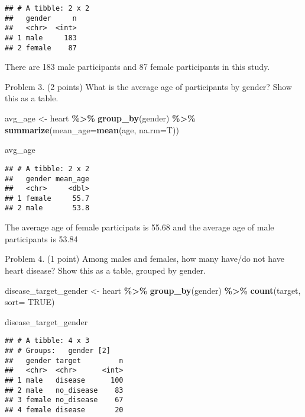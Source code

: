 \documentclass[
]{article}
\newenvironment{Shaded}{\begin{snugshade}}{\end{snugshade}}
\newcommand{\AttributeTok}[1]{\textcolor[rgb]{0.13,0.29,0.53}{#1}}
\newcommand{\ConstantTok}[1]{\textcolor[rgb]{0.56,0.35,0.01}{#1}}
\newcommand{\FunctionTok}[1]{\textcolor[rgb]{0.13,0.29,0.53}{\textbf{#1}}}
\newcommand{\NormalTok}[1]{#1}
\newcommand{\OtherTok}[1]{\textcolor[rgb]{0.56,0.35,0.01}{#1}}
\newcommand{\SpecialCharTok}[1]{\textcolor[rgb]{0.81,0.36,0.00}{\textbf{#1}}}
\begin{document}
\begin{verbatim}
## # A tibble: 2 x 2
##   gender     n
##   <chr>  <int>
## 1 male     183
## 2 female    87
\end{verbatim}

There are 183 male participants and 87 female participants in this
study.

Problem 3. (2 points) What is the average age of participants by gender?
Show this as a table.

\begin{Shaded}
\begin{Highlighting}[]
\NormalTok{avg\_age }\OtherTok{\textless{}{-}}\NormalTok{ heart }\SpecialCharTok{\%\textgreater{}\%}
  \FunctionTok{group\_by}\NormalTok{(gender) }\SpecialCharTok{\%\textgreater{}\%}
  \FunctionTok{summarize}\NormalTok{(}\AttributeTok{mean\_age=}\FunctionTok{mean}\NormalTok{(age, }\AttributeTok{na.rm=}\NormalTok{T))}

\NormalTok{avg\_age}
\end{Highlighting}
\end{Shaded}

\begin{verbatim}
## # A tibble: 2 x 2
##   gender mean_age
##   <chr>     <dbl>
## 1 female     55.7
## 2 male       53.8
\end{verbatim}

The average age of female participats is 55.68 and the average age of
male participants is 53.84

Problem 4. (1 point) Among males and females, how many have/do not have
heart disease? Show this as a table, grouped by gender.

\begin{Shaded}
\begin{Highlighting}[]
\NormalTok{disease\_target\_gender }\OtherTok{\textless{}{-}}\NormalTok{ heart }\SpecialCharTok{\%\textgreater{}\%}
  \FunctionTok{group\_by}\NormalTok{(gender) }\SpecialCharTok{\%\textgreater{}\%}
  \FunctionTok{count}\NormalTok{(target, }\AttributeTok{sort=} \ConstantTok{TRUE}\NormalTok{)}

\NormalTok{disease\_target\_gender}
\end{Highlighting}
\end{Shaded}

\begin{verbatim}
## # A tibble: 4 x 3
## # Groups:   gender [2]
##   gender target         n
##   <chr>  <chr>      <int>
## 1 male   disease      100
## 2 male   no_disease    83
## 3 female no_disease    67
## 4 female disease       20
\end{verbatim}
\end{document}
